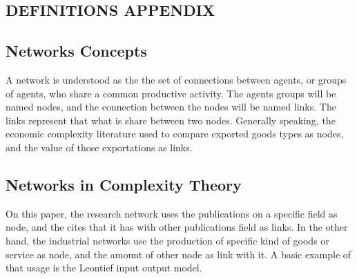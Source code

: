 \documentclass[12pt]{article}
\begin{document}
\begin{center}
    \section*{DEFINITIONS APPENDIX}
\end{center}

\subsection*{Networks Concepts}

A network is understood as the the set of connections between
agents, or groups of agents, who share a common productive
activity. The agents groups will be named nodes, and the 
connection between the nodes will be named links. The links
represent that what is share between two nodes. Generally
speaking, the economic complexity literature used to 
compare exported goods types as nodes, and the value of those
exportations as links.

\subsection*{Networks in Complexity Theory}

On this paper, the research network uses the publications on
a specific field as node, and the cites that it has with other 
publications field as links. In the other hand, the industrial
networks use the production of specific kind of goods or
service as node, and the amount of other node as link with it.
A basic example of that usage is the Leontief input output
model.
\end{document}
